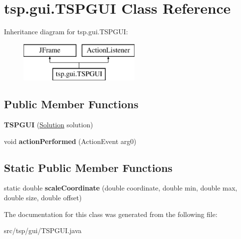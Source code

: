 \hypertarget{classtsp_1_1gui_1_1_t_s_p_g_u_i}{}\section{tsp.\+gui.\+T\+S\+P\+G\+UI Class Reference}
\label{classtsp_1_1gui_1_1_t_s_p_g_u_i}
Inheritance diagram for tsp.\+gui.\+T\+S\+P\+G\+UI\+:\begin{figure}[H]
\begin{center}
\leavevmode
\includegraphics[height=2.000000cm]{classtsp_1_1gui_1_1_t_s_p_g_u_i}
\end{center}
\end{figure}
\subsection*{Public Member Functions}
\begin{DoxyCompactItemize}
\item 
\mbox{\label{classtsp_1_1gui_1_1_t_s_p_g_u_i_ac73a45c3b122b01298636acd265895a9}} 
{\bfseries T\+S\+P\+G\+UI} (\mbox{\hyperlink{classtsp_1_1_solution}{Solution}} solution)
\item 
\mbox{\label{classtsp_1_1gui_1_1_t_s_p_g_u_i_af3df3b3d93921721e1e35670bace851d}} 
void {\bfseries action\+Performed} (Action\+Event arg0)
\end{DoxyCompactItemize}
\subsection*{Static Public Member Functions}
\begin{DoxyCompactItemize}
\item 
\mbox{\label{classtsp_1_1gui_1_1_t_s_p_g_u_i_abc3c3ac492a0a3fe6ae0d73c43381250}} 
static double {\bfseries scale\+Coordinate} (double coordinate, double min, double max, double size, double offset)
\end{DoxyCompactItemize}


The documentation for this class was generated from the following file\+:\begin{DoxyCompactItemize}
\item 
src/tsp/gui/T\+S\+P\+G\+U\+I.\+java\end{DoxyCompactItemize}
